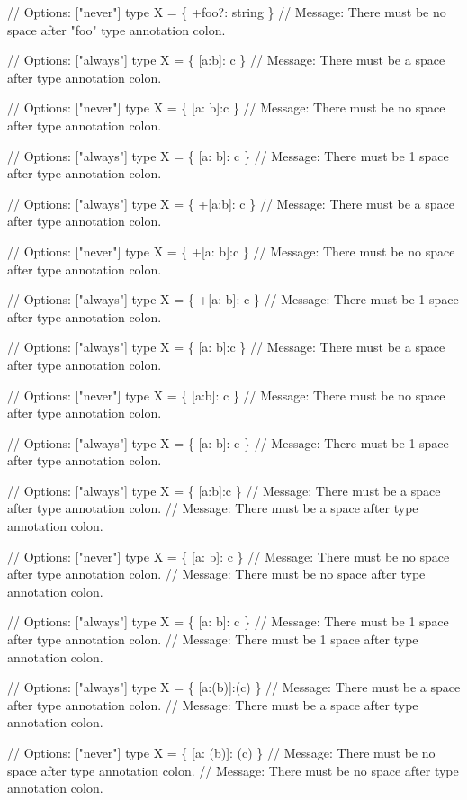 \begin{DoxyCode}
// Options: ["never"]
type X = \{ +foo?: string \}
// Message: There must be no space after "foo" type annotation colon.

// Options: ["always"]
type X = \{ [a:b]: c \}
// Message: There must be a space after type annotation colon.

// Options: ["never"]
type X = \{ [a: b]:c \}
// Message: There must be no space after type annotation colon.

// Options: ["always"]
type X = \{ [a:    b]: c \}
// Message: There must be 1 space after type annotation colon.

// Options: ["always"]
type X = \{ +[a:b]: c \}
// Message: There must be a space after type annotation colon.

// Options: ["never"]
type X = \{ +[a: b]:c \}
// Message: There must be no space after type annotation colon.

// Options: ["always"]
type X = \{ +[a:    b]: c \}
// Message: There must be 1 space after type annotation colon.

// Options: ["always"]
type X = \{ [a: b]:c \}
// Message: There must be a space after type annotation colon.

// Options: ["never"]
type X = \{ [a:b]: c \}
// Message: There must be no space after type annotation colon.

// Options: ["always"]
type X = \{ [a: b]:    c \}
// Message: There must be 1 space after type annotation colon.

// Options: ["always"]
type X = \{ [a:b]:c \}
// Message: There must be a space after type annotation colon.
// Message: There must be a space after type annotation colon.

// Options: ["never"]
type X = \{ [a: b]: c \}
// Message: There must be no space after type annotation colon.
// Message: There must be no space after type annotation colon.

// Options: ["always"]
type X = \{ [a:  b]:  c \}
// Message: There must be 1 space after type annotation colon.
// Message: There must be 1 space after type annotation colon.

// Options: ["always"]
type X = \{ [a:(b)]:(c) \}
// Message: There must be a space after type annotation colon.
// Message: There must be a space after type annotation colon.

// Options: ["never"]
type X = \{ [a: (b)]: (c) \}
// Message: There must be no space after type annotation colon.
// Message: There must be no space after type annotation colon.


\end{DoxyCode}
